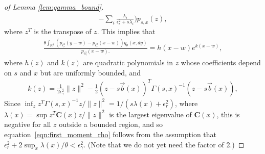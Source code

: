 \documentclass[EJP]{ejpecp} %
\newcommand{\IR}{\mathbb R}
\newcommand{\meanq}{\vec b}    %
\newcommand{\covq}{\mathbf{C}}     %
\begin{document}
\begin{proof}[of Lemma \ref{lem:gamma_bound}]
\begin{align*}
            -
            \sum_i \frac{\lambda_i}{\epsilon_r^2 + s \lambda_i}
        \bigg)
        p_{s, x}(z) ,
    \end{align*}
    where $z^T$ is the transpose of $z$.
    This implies that
    \begin{align*}
        \frac{
        \theta
            \int_{\IR^d}
                ( p_{\epsilon_r^2}(y-w) - p_{\epsilon_r^2}(x-w) )
            q_\theta(x, dy)
        }{
            p_{\epsilon^2_\gamma}(x-w) .
        }
        =
        h(x-w) e^{k(x-w)},
    \end{align*}
    where $h(z)$ and $k(z)$ are quadratic polynomials in $z$
    whose coefficients depend on $s$ and $x$ but are uniformly bounded,
    and
    \begin{align*}
        k(z)
        =
        \frac{1}{2\epsilon_\gamma^2} \|z\|^2
        -\frac{1}{2} (z - s\meanq(x))^T \Gamma(s,x)^{-1} (z - s\meanq(x)) ,
    \end{align*}
    Since $\inf_z z^T \Gamma(s,x)^{-1} z / \|z\|^2 = 1 / (s \lambda(x) + \epsilon_r^2)$,
    where $\lambda(x) = \sup z^T \covq(x) z / \|z\|^2$ is the largest eigenvalue of $\covq(x)$,
    this is negative for all $z$ outside a bounded region, and so
    equation~\eqref{eqn:first_moment_rho} follows from the assumption
    that $\epsilon_r^2 + 2 \sup_x \lambda(x)/\theta < \epsilon_\gamma^2$.
    (Note that we do not yet need the factor of 2.)


\end{proof}
\end{document}
